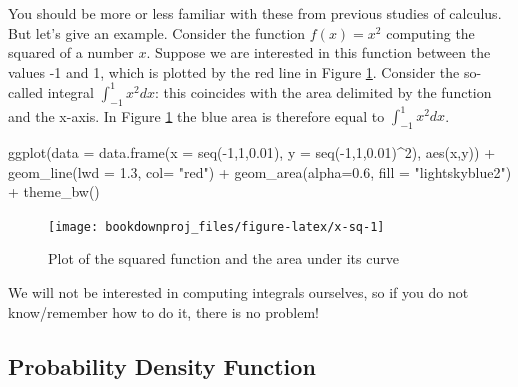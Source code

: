 \documentclass[
]{book}
\newenvironment{Shaded}{\begin{snugshade}}{\end{snugshade}}
\newcommand{\AttributeTok}[1]{\textcolor[rgb]{0.77,0.63,0.00}{#1}}
\newcommand{\DecValTok}[1]{\textcolor[rgb]{0.00,0.00,0.81}{#1}}
\newcommand{\FloatTok}[1]{\textcolor[rgb]{0.00,0.00,0.81}{#1}}
\newcommand{\FunctionTok}[1]{\textcolor[rgb]{0.00,0.00,0.00}{#1}}
\newcommand{\NormalTok}[1]{#1}
\newcommand{\SpecialCharTok}[1]{\textcolor[rgb]{0.00,0.00,0.00}{#1}}
\newcommand{\StringTok}[1]{\textcolor[rgb]{0.31,0.60,0.02}{#1}}
\theoremstyle{definition}
\theoremstyle{definition}
\theoremstyle{definition}
\theoremstyle{definition}
\theoremstyle{remark}
\begin{document}
You should be more or less familiar with these from previous studies of calculus. But let's give an example. Consider the function \(f(x)=x^2\) computing the squared of a number \(x\). Suppose we are interested in this function between the values -1 and 1, which is plotted by the red line in Figure \ref{fig:x-sq}. Consider the so-called integral \(\int_{-1}^{1}x^2dx\): this coincides with the area delimited by the function and the x-axis. In Figure \ref{fig:x-sq} the blue area is therefore equal to \(\int_{-1}^{1}x^2dx\).

\begin{Shaded}
\begin{Highlighting}[]
\FunctionTok{ggplot}\NormalTok{(}\AttributeTok{data =} \FunctionTok{data.frame}\NormalTok{(}\AttributeTok{x =} \FunctionTok{seq}\NormalTok{(}\SpecialCharTok{{-}}\DecValTok{1}\NormalTok{,}\DecValTok{1}\NormalTok{,}\FloatTok{0.01}\NormalTok{), }\AttributeTok{y =} \FunctionTok{seq}\NormalTok{(}\SpecialCharTok{{-}}\DecValTok{1}\NormalTok{,}\DecValTok{1}\NormalTok{,}\FloatTok{0.01}\NormalTok{)}\SpecialCharTok{\^{}}\DecValTok{2}\NormalTok{), }\FunctionTok{aes}\NormalTok{(x,y)) }\SpecialCharTok{+} \FunctionTok{geom\_line}\NormalTok{(}\AttributeTok{lwd =} \FloatTok{1.3}\NormalTok{, }\AttributeTok{col=} \StringTok{"red"}\NormalTok{) }\SpecialCharTok{+} \FunctionTok{geom\_area}\NormalTok{(}\AttributeTok{alpha=}\FloatTok{0.6}\NormalTok{, }\AttributeTok{fill =} \StringTok{"lightskyblue2"}\NormalTok{) }\SpecialCharTok{+}  \FunctionTok{theme\_bw}\NormalTok{() }
\end{Highlighting}
\end{Shaded}

\begin{figure}

{\centering \texttt{[image: bookdownproj\_files/figure-latex/x-sq-1]} 

}

\caption{Plot of the squared function and the area under its curve}\label{fig:x-sq}
\end{figure}

We will not be interested in computing integrals ourselves, so if you do not know/remember how to do it, there is no problem!

\hypertarget{probability-density-function}{%
\subsection{Probability Density Function}\label{probability-density-function}}
\end{document}
